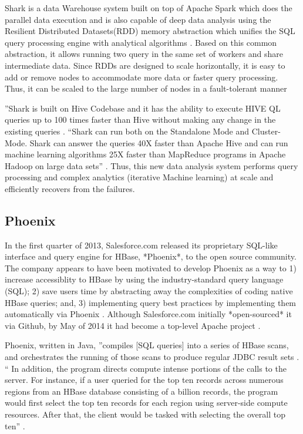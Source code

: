      Shark is a data Warehouse system built on top of Apache Spark
     which does the parallel data execution and is also capable of
     deep data analysis using the Resilient Distributed Datasets(RDD)
     memory abstraction which unifies the SQL query processing engine
     with analytical algorithms \cite{shark-paper-2012}. Based on
     this common abstraction, it allows running two query in the same
     set of workers and share intermediate data. Since RDDs are
     designed to scale horizontally, it is easy to add or remove nodes
     to accommodate more data or faster query processing. Thus, it can
     be scaled to the large number of nodes in a fault-tolerant manner

     ''Shark is built on Hive Codebase and it has the ability to
     execute HIVE QL queries up to 100 times faster than Hive without
     making any change in the existing queries
     \cite{shark-paper-2012}. ``Shark can run both on the Standalone
     Mode and Cluster-Mode. Shark can answer the queries 40X faster
     than Apache Hive and can run machine learning algorithms 25X
     faster than MapReduce programs in Apache Hadoop on large data
     sets'' \cite{shark-paper-2012}. Thus, this new data analysis system
     performs query processing and complex analytics (iterative
     Machine learning) at scale and efficiently recovers from the
     failures.

\subsection{Phoenix}

     In the first quarter of 2013, Salesforce.com released its
     proprietary SQL-like interface and query engine for HBase,
     *Phoenix*, to the open source community.  The company appears to
     have been motivated to develop Phoenix as a way to 1) increase
     accessiblity to HBase by using the industry-standard query
     language (SQL); 2) save users time by abstracting away the
     complexities of coding native HBase queries; and, 3) implementing
     query best practices by implementing them automatically via
     Phoenix \cite{www-phoenix-cloudera}. Although Salesforce.com
     initially *open-sourced* it via Github, by May of 2014 it had
     become a top-level Apache project \cite{www-phoenix-wikipedia}.

     Phoenix, written in Java, ''compiles [SQL queries] into a series
     of HBase scans, and orchestrates the running of those scans to
     produce regular JDBC result sets \cite{www-apachephoenix-org}. ``
     In addition, the program directs compute intense portions of the
     calls to the server.  For instance, if a user queried for the top
     ten records across numerous regions from an HBase database
     consisting of a billion records, the program would first select
     the top ten records for each region using server-side compute
     resources.  After that, the client would be tasked with selecting
     the overall top ten'' \cite{www-phoenix-salesforcedev}.

